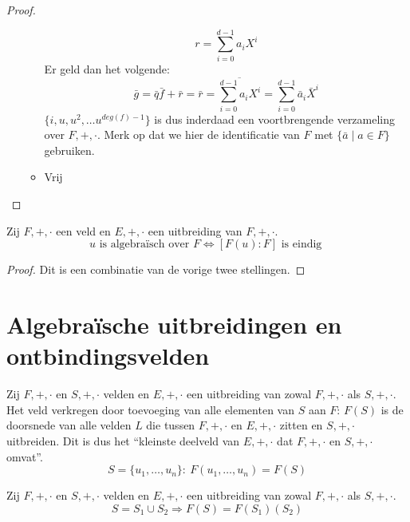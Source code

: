 \documentclass[main.tex]{subfiles}
\begin{document}
\begin{st}
\begin{proof}
\begin{itemize}
\begin{itemize}
        \[ r = \sum_{i=0}^{d-1}a_{i}X^{i} \]
        Er geld dan het volgende:\waarom
        \[ \bar{g} = \bar{q}\bar{f} + \bar{r} = \bar{r} = \overline{\sum_{i=0}^{d-1}a_{i}X^{i}} = \sum_{i=0}^{d-1}\bar{a}_{i}\bar{X}^{i} \]
        $\{ i,u,u^{2},\dotsc u^{deg(f)-1} \}$ is dus inderdaad een voortbrengende verzameling over $F,+,\cdot$.
        Merk op dat we hier de identificatie van $F$ met $\{ \bar{a}\mid a\in F\}$ gebruiken.
      \item Vrij\\
      \end{itemize}
    \end{itemize}
  \end{proof}
\end{st}

\begin{gev}
  Zij $F,+,\cdot$ een veld en $E,+,\cdot$ een uitbreiding van $F,+,\cdot$.
  \[ u \text{ is algebra\"isch over } F \Leftrightarrow [F(u):F] \text{ is eindig } \]

  \begin{proof}
    Dit is een combinatie van de vorige twee stellingen. 
  \end{proof}
\end{gev}

\section{Algebra\"ische uitbreidingen en ontbindingsvelden}
\label{sec:algebr-uitbr-en}

\begin{de}
  Zij $F,+,\cdot$ en $S,+,\cdot$ velden en $E,+,\cdot$ een uitbreiding van zowal $F,+,\cdot$ als $S,+,\cdot$.
  Het veld verkregen door toevoeging van alle elementen van $S$ aan $F$: $F(S)$ is de doorsnede van alle velden $L$ die tussen $F,+,\cdot$ en $E,+,\cdot$ zitten en $S,+,\cdot$ uitbreiden.
  Dit is dus het ``kleinste deelveld van $E,+,\cdot$ dat $F,+,\cdot$ en $S,+,\cdot$ omvat''.
  \[ S = \{ u_{1},\dotsc,u_{n} \}:\ F(u_{1},\dotsc,u_{n}) = F(S) \]
\end{de}


\begin{st}
  Zij $F,+,\cdot$ en $S,+,\cdot$ velden en $E,+,\cdot$ een uitbreiding van zowal $F,+,\cdot$ als $S,+,\cdot$.
  \[ S = S_{1} \cup S_{2} \Rightarrow F(S) = F(S_{1})(S_{2}) \]
\end{st}
\end{document}
